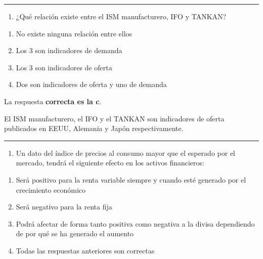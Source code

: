 \documentclass[
  letterpaper,
  DIV=11,
  numbers=noendperiod]{scrreprt}
\providecommand{\tightlist}{%
  \setlength{\itemsep}{0pt}\setlength{\parskip}{0pt}}\usepackage{longtable,booktabs,array}
\begin{document}
\begin{center}\rule{0.5\linewidth}{0.5pt}\end{center}

\begin{enumerate}
\def\labelenumi{\arabic{enumi}.}
\setcounter{enumi}{34}
\tightlist
\item
  ¿Qué relación existe entre el ISM manufacturero, IFO y TANKAN?
\end{enumerate}

\begin{enumerate}
\def\labelenumi{\alph{enumi})}
\item
  No existe ninguna relación entre ellos
\item
  Los 3 son indicadores de demanda
\item
  Los 3 son indicadores de oferta
\item
  Dos son indicadores de oferta y uno de demanda
\end{enumerate}

\begin{tcolorbox}[enhanced jigsaw, left=2mm, opacityback=0, colback=white, breakable, arc=.35mm, bottomrule=.15mm, rightrule=.15mm, toprule=.15mm, leftrule=.75mm, colframe=quarto-callout-tip-color-frame]
\begin{minipage}[t]{5.5mm}
\textcolor{quarto-callout-tip-color}{\faLightbulb}
\end{minipage}%
\begin{minipage}[t]{\textwidth - 5.5mm}

La respuesta \textbf{correcta es la c}.

El ISM manufacturero, el IFO y el TANKAN son indicadores de oferta
publicados en EEUU, Alemania y Japón respectivamente.

\end{minipage}%
\end{tcolorbox}

\begin{center}\rule{0.5\linewidth}{0.5pt}\end{center}

\begin{enumerate}
\def\labelenumi{\arabic{enumi}.}
\setcounter{enumi}{35}
\tightlist
\item
  Un dato del índice de precios al consumo mayor que el esperado por el
  mercado, tendrá el siguiente efecto en los activos financieros:
\end{enumerate}

\begin{enumerate}
\def\labelenumi{\alph{enumi})}
\item
  Será positivo para la renta variable siempre y cuando esté generado
  por el crecimiento económico
\item
  Será negativo para la renta fija
\item
  Podrá afectar de forma tanto positiva como negativa a la divisa
  dependiendo de por qué se ha generado el aumento
\item
  Todas las respuestas anteriores son correctas
\end{enumerate}
\end{document}
